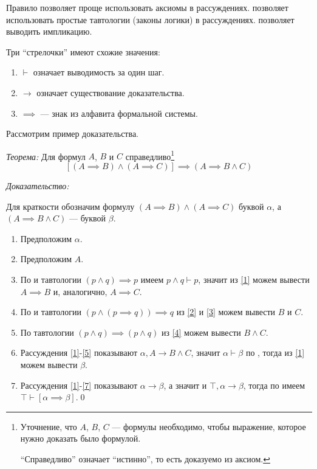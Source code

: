 Правило \axiom{} позволяет проще использовать аксиомы в рассуждениях.
\taut{} позволяет использовать простые тавтологии (законы логики) в рассуждениях.
\implic{} позволяет выводить импликацию.

Три ``стрелочки'' имеют схожие значения:
\begin{enumerate}
	\item{}$\vdash$ означает выводимость за один шаг.
	\item{}$\to$ означает существование доказательства.
	\item{}$\implies$ --- знак из алфавита формальной системы.
\end{enumerate}

Рассмотрим пример доказательства.

{\it Теорема:} Для формул $A$, $B$ и $C$ справедливо\footnote[][3mm]{
	Уточнение, что $A$, $B$, $C$ --- формулы необходимо, чтобы выражение, которое
	нужно доказать было формулой.

	``Справедливо'' означает ``истинно'', то есть доказуемо из аксиом.
}
\[
	[(A\implies B)\land (A\implies C)]\implies (A\implies B\land C)
\]

{\it Доказательство:}

Для краткости обозначим формулу
$(A\implies B)\land (A\implies C)$ буквой $\alpha$,
а $(A\implies B\land C)$ --- буквой $\beta$.

\begin{enumerate}[label=(\arabic*)]
	\item{}\label{1}Предположим $\alpha$.

	\item{}\label{2}Предположим $A$.

	\item{}\label{3}По \taut{} и тавтологии $(p\land q)\implies p$ имеем
	$p\land q\vdash p$, значит из \ref{1} можем вывести
	$A\implies B$ и, аналогично, $A\implies C$.

	\item{}\label{4}По \taut{} и тавтологии ${(p\land (p\implies q))\implies q}$
	из \ref{2} и \ref{3} можем вывести $B$ и $C$.

	\item{}\label{5}По тавтологии $(p\land q)\implies(p\land q)$
	из \ref{4} можем вывести $B\land C$.

	\item{}\label{6}Рассуждения \ref{1}-\ref{5} показывают
	$\alpha,A\to B\land C$, значит $\alpha\vdash \beta$ по \implic{},
	тогда из \ref{1} можем вывести $\beta$.

	\item{}\label{7}
	Рассуждения \ref{1}-\ref{7} показывают $\alpha\to\beta$,
	а значит и $\top,\alpha\to\beta$, тогда по \implic{}
	имеем $\top\vdash [\alpha\implies\beta]$.\qed
\end{enumerate}

